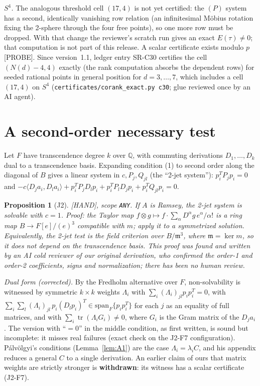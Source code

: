 \documentclass[11pt]{amsart}
\newcommand{\st}[1]{\textsf{[#1]}}
\newcommand{\Q}{\mathbb{Q}}
\theoremstyle{plain}
\newtheorem{proposition}[theorem]{Proposition}
\theoremstyle{definition}
\begin{document}
\noindent\emph{$S^4$.} The analogous threshold cell $(17,4)$ is not yet certified: the $(P)$ system has a
second, identically vanishing row relation (an infinitesimal M\"obius rotation fixing the 2-sphere through
the four free points), so one more row must be dropped. With that change the reviewer's scratch run gives
an exact $E(\tau)\neq0$; that computation is not part of this release. A scalar certificate exists modulo
$p$ \st{PROBE}. Since version~1.1, ledger entry SR-C30 certifies the cell $(N(d)-4,4)$ exactly (the
rank computation absorbs the dependent rows) for seeded rational points in general position for $d=3,\dots,7$, which includes a
cell $(17,4)$ on $S^4$ (\texttt{certificates/corank\_exact.py c30}; glue reviewed once by an AI agent).

\section{A second-order necessary test}\label{sec:jet}

Let $F$ have transcendence degree $k$ over $\Q$, with commuting derivations $D_1,\dots,D_k$ dual to a
transcendence basis. Expanding condition (1) to second order along the diagonal of $B$ gives a linear
system in $c,P_j,Q_{jl}$ (the ``2-jet system''): $p_i^TP_jp_i=0$ and
$-c\langle D_ja_i,D_la_i\rangle+p_i^TP_jD_lp_i+p_i^TP_lD_jp_i+p_i^TQ_{jl}p_i=0$.

\begin{proposition}[J2]\label{prop:J2}
\st{HAND}, scope \texttt{ANY}. If $A$ is Ramsey, the 2-jet system is solvable with $c=1$. Proof: the
Taylor map $f\otimes g\mapsto f\cdot\sum_\alpha D^\alpha g\,e^\alpha/\alpha!$ is a ring map
$B\to F[e]/(e)^3$ compatible with $m$; apply it to a symmetrized solution. Equivalently, the 2-jet test
is the field criterion over $B/\mathfrak m^3$, where $\mathfrak m=\ker m$, so it does not depend on the
transcendence basis. This proof was found and written by an AI cold reviewer of our original derivation,
who confirmed the order-1 and order-2 coefficients, signs and normalization; there has been no human
review.
\end{proposition}

\noindent\emph{Dual form (corrected).} By the Fredholm alternative over $F$, non-solvability is
witnessed by symmetric $k\times k$ weights $\Lambda_i$ with $\sum_i(\Lambda_i)_{jl}p_ip_i^T=0$, with
$\sum_i\sum_l(\Lambda_i)_{jl}\,p_i(D_lp_i)^T\in\mathrm{span}_F\{p_ip_i^T\}$ for each $j$ as an equality of
full matrices, and with $\sum_i\operatorname{tr}(\Lambda_iG_i)\neq0$, where $G_i$ is the Gram matrix of the
$D_ja_i$. The version with ``$=0$'' in the middle condition, as first written, is sound but incomplete: it
misses real failures (exact check on the J2-F7 configuration). P\'alv\"olgyi's conditions
(Lemma~\ref{lem:A1}) are the case $\Lambda_i=\lambda_iC$, and his appendix reduces a general $C$ to a
single derivation. An earlier claim of ours that matrix weights are strictly stronger is
\textbf{withdrawn}: its witness has a scalar certificate (J2-F7).
\end{document}
